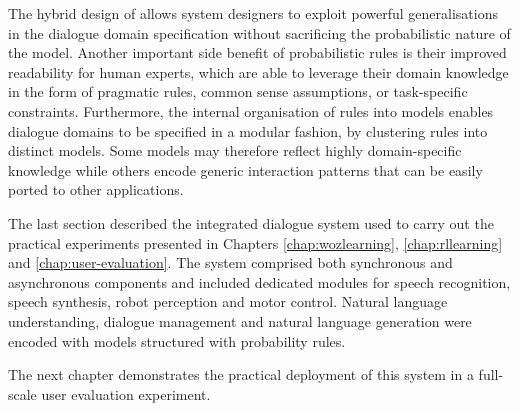 The hybrid design  of \opendial allows system designers to exploit powerful generalisations in the dialogue domain specification without sacrificing the probabilistic nature of the model. Another important side benefit of probabilistic rules is their improved readability for human experts, which are able to leverage their domain knowledge in the form of pragmatic rules, common sense assumptions, or task-specific constraints. Furthermore, the internal organisation of rules into models enables dialogue domains to be specified in a modular fashion, by clustering rules into distinct models.  Some models may therefore reflect highly domain-specific knowledge while others encode generic interaction patterns that can be easily ported to other applications.  

The last section described the integrated dialogue system used to carry out the practical experiments presented in Chapters \ref{chap:wozlearning}, \ref{chap:rllearning} and \ref{chap:user-evaluation}.  The system comprised both synchronous and asynchronous components and included dedicated modules for speech recognition, speech synthesis, robot perception and motor control.  Natural language understanding, dialogue management and natural language generation were encoded with models structured with probability rules. 

The next chapter demonstrates the practical deployment of this system in a full-scale user evaluation experiment. 